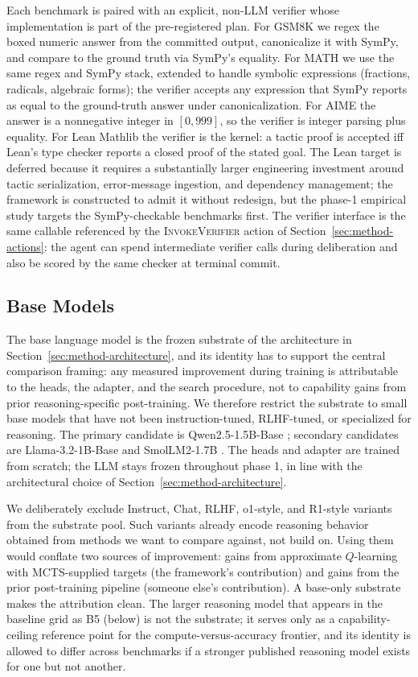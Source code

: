 Each benchmark is paired with an explicit, non-LLM verifier whose
implementation is part of the pre-registered plan. For GSM8K we regex
the boxed numeric answer from the committed output, canonicalize it
with SymPy, and compare to the ground truth via SymPy's equality. For
MATH we use the same regex and SymPy stack, extended to handle
symbolic expressions (fractions, radicals, algebraic forms); the
verifier accepts any expression that SymPy reports as equal to the
ground-truth answer under canonicalization. For AIME the answer is a
nonnegative integer in $[0, 999]$, so the verifier is integer parsing
plus equality. For Lean Mathlib the verifier is the kernel: a tactic
proof is accepted iff Lean's type checker reports a closed proof of the
stated goal. The Lean target is deferred because it requires a
substantially larger engineering investment around tactic
serialization, error-message ingestion, and dependency management; the
framework is constructed to admit it without redesign, but the phase-1
empirical study targets the SymPy-checkable benchmarks first. The
verifier interface is the same callable referenced by the
\textsc{InvokeVerifier} action of Section~\ref{sec:method-actions}: the
agent can spend intermediate verifier calls during deliberation and
also be scored by the same checker at terminal commit.

\subsection{Base Models}
\label{sec:exp-models}

The base language model is the frozen substrate of the architecture in
Section~\ref{sec:method-architecture}, and its identity has to support
the central comparison framing: any measured improvement during
training is attributable to the heads, the adapter, and the search
procedure, not to capability gains from prior reasoning-specific
post-training. We therefore restrict the substrate to small base models
that have not been instruction-tuned, RLHF-tuned, or specialized for
reasoning. The primary candidate is Qwen2.5-1.5B-Base
\citep{yang2024qwen25}; secondary candidates are Llama-3.2-1B-Base
\citep{dubey2024llama3} and SmolLM2-1.7B \citep{allal2024smollm2}. The
heads and adapter are trained from scratch; the LLM stays frozen
throughout phase 1, in line with the architectural choice of
Section~\ref{sec:method-architecture}.

We deliberately exclude Instruct, Chat, RLHF, o1-style, and R1-style
variants \citep{openai2024o1, guo2025deepseekr1} from the substrate
pool. Such variants already encode reasoning behavior obtained from
methods we want to compare against, not build on. Using them would
conflate two sources of improvement: gains from approximate
$Q$-learning with MCTS-supplied targets (the framework's contribution)
and gains from the prior post-training pipeline (someone else's
contribution). A base-only substrate makes the attribution clean. The
larger reasoning model that appears in the baseline grid as B5 (below)
is not the substrate; it serves only as a capability-ceiling reference
point for the compute-versus-accuracy frontier, and its identity is
allowed to differ across benchmarks if a stronger published reasoning
model exists for one but not another.

